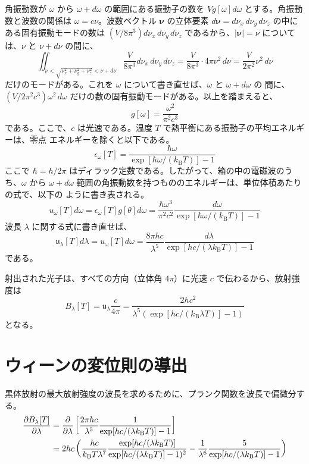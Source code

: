\documentclass[book]{dennou777}
\begin{document}
角振動数が \(\omega\) から \(\omega+d\omega\) の範囲にある振動子の数を \(Vg[\omega]d\omega\)
とする。角振動数と波数の関係は \(\omega=c\nu\)。波数ベクトル \(\mathbold{\nu}\) の立体要素
\(d\mathbold{\nu}=d\nu_x\,d\nu_y\,d\nu_z\) の中にある固有振動モードの数は
\((V/8\pi^3)d\nu_x\,d\nu_y\,d\nu_z\) であるから、\(|\mathbold{\nu}|=\nu\) については、\(\nu\)
と \(\nu+d\nu\) の間に、
\begin{equation}
	\iint_{\nu<\sqrt{\nu_x^2+\nu_y^2+\nu_z^2}<\nu+d\nu}\frac{V}{8\pi^3}d\nu_x\,d\nu_y\,d\nu_z
	=\frac{V}{8\pi^3}\cdot4\pi\nu^2\,d\nu=\frac{V}{2\pi^2}\nu^2\,d\nu
\end{equation}
だけのモードがある。これを \(\omega\) について書き直せば、\(\omega\) と \(\omega+d\omega\) の
間に、\((V/2\pi^2c^3)\omega^2\,d\omega\) だけの数の固有振動モードがある。以上を踏まえると、
\begin{equation}
	g[\omega]=\frac{\omega^2}{\pi^2c^3}
\end{equation}
である。ここで、\(c\) は光速である。温度 \(T\) で熱平衡にある振動子の平均エネルギーは、零点
エネルギーを除くと以下である。
\begin{equation}
	\epsilon_\omega[T]=\frac{\hbar\omega}{\exp[\hbar\omega/(k_\mathrm{B}T)]-1}
\end{equation}
ここで \(\hbar=h/2\pi\) はディラック定数である。したがって、箱の中の電磁波のうち、\(\omega\)
から \(\omega+d\omega\) 範囲の角振動数を持つもののエネルギーは、単位体積あたりの式で、以下の
ように書き表される。
\begin{equation}
	u_\omega[T]d\omega=\epsilon_\omega[T]g[\theta]d\omega
	=\frac{\hbar\omega^3}{\pi^2c^2}\frac{d\omega}{\exp[\hbar\omega/(k_\mathrm{B}T)]-1}
\end{equation}
波長 \(\lambda\) に関する式に書き直せば、
\begin{equation}
	\mathfrak{u}_\lambda[T]d\lambda=u_\omega[T]d\omega
	=\frac{8\pi hc}{\lambda^5}\frac{d\lambda}{\exp[hc/(\lambda k_\mathrm{B}T)]-1}
\end{equation}
である。

射出された光子は、すべての方向（立体角 \(4\pi\)）に光速 \(c\) で伝わるから、放射強度は
\begin{equation}
	B_\lambda[T]=\mathfrak{u}_\lambda\frac{c}{4\pi}=
	\frac{2hc^2}{\lambda^5(\exp[hc/(k_\mathrm{B}\lambda T)]-1)}
\end{equation}
となる。

\chapter{ウィーンの変位則の導出}
黒体放射の最大放射強度の波長を求めるために、プランク関数を波長で偏微分する。
\begin{align}
	\frac{\partial B_\lambda[T]}{\partial\lambda}
	&=\frac{\partial}{\partial\lambda}\left[\frac{2\pi hc}{\lambda^5}
		\frac{1}{\exp[hc/(\lambda k_\mathrm{B}T)]-1}\right]\notag\\
	&=2hc\left(\frac{hc}{k_\mathrm{B}T\lambda^7}
		\frac{\exp[hc/(\lambda k_\mathrm{B}T)]}{\exp[hc/(\lambda k_\mathrm{B}T)]-1)^2}
		-\frac{1}{\lambda^6}\frac{5}{\exp[hc/(\lambda k_\mathrm{B}T)]-1}\right)\label{dbdl}
\end{align}
\end{document}
